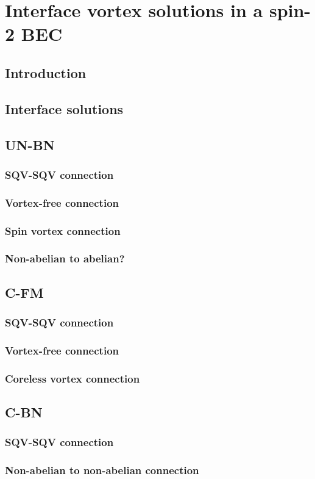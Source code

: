 \chapter{Interface vortex solutions in a spin-2 BEC}\label{chap: spin-2}

\section{Introduction}

\section{Interface solutions}

\section{UN-BN}
\subsection{SQV-SQV connection}
\subsection{Vortex-free connection}
\subsection{Spin vortex connection}
\subsection{Non-abelian to abelian?}

\section{C-FM}
\subsection{SQV-SQV connection}
\subsection{Vortex-free connection}
\subsection{Coreless vortex connection}

\section{C-BN}
\subsection{SQV-SQV connection}
\subsection{Non-abelian to non-abelian connection}
